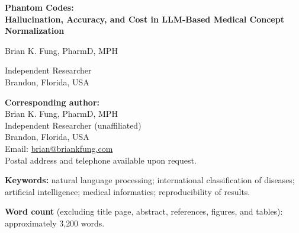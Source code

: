 %
%

\begin{center}

\vspace*{0.5in}

{\LARGE\bfseries Phantom Codes:\\[0.4em]
\Large Hallucination, Accuracy, and Cost in LLM-Based Medical Concept Normalization\par}

\vspace{2.5em}

{\large Brian K. Fung, PharmD, MPH\par}

\vspace{0.4em}

{\small Independent Researcher \\
Brandon, Florida, USA\par}

\vspace{2.5em}

\textbf{Corresponding author:}\\
Brian K. Fung, PharmD, MPH\\
Independent Researcher (unaffiliated)\\
Brandon, Florida, USA\\
Email: \href{mailto:brian@briankfung.com}{brian@briankfung.com}\\
Postal address and telephone available upon request.

\vfill

\begin{flushleft}
\textbf{Keywords:} natural language processing; international
classification of diseases; artificial intelligence; medical
informatics; reproducibility of results.

\medskip

\textbf{Word count} (excluding title page, abstract, references,
figures, and tables): approximately 3{,}200 words.
\end{flushleft}

\end{center}

